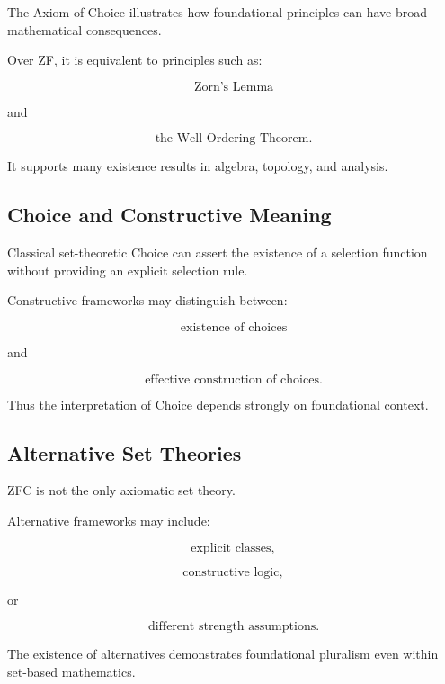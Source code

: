 The Axiom of Choice illustrates how foundational principles can have broad
mathematical consequences.

Over ZF, it is equivalent to principles such as:

\[
\boxed{
\text{Zorn's Lemma}
}
\]

and

\[
\boxed{
\text{the Well-Ordering Theorem}.
}
\]

It supports many existence results in algebra, topology, and analysis.

\subsection{Choice and Constructive Meaning}
\label{subsec:choice-constructive-meaning}

Classical set-theoretic Choice can assert the existence of a selection
function without providing an explicit selection rule.

Constructive frameworks may distinguish between:

\[
\boxed{
\text{existence of choices}
}
\]

and

\[
\boxed{
\text{effective construction of choices}.
}
\]

Thus the interpretation of Choice depends strongly on foundational context.

\subsection{Alternative Set Theories}
\label{subsec:alternative-set-theories}

ZFC is not the only axiomatic set theory.

Alternative frameworks may include:

\[
\boxed{
\text{explicit classes},
}
\]

\[
\boxed{
\text{constructive logic},
}
\]

or

\[
\boxed{
\text{different strength assumptions}.
}
\]

The existence of alternatives demonstrates foundational pluralism even
within set-based mathematics.

